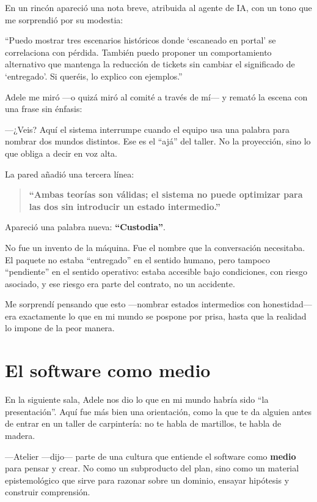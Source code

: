 \documentclass[11pt,a4paper]{article}
\begin{document}
En un rincón apareció una nota breve, atribuida al agente de IA, con un tono
que me sorprendió por su modestia:

``Puedo mostrar tres escenarios históricos donde `escaneado en portal' se
correlaciona con pérdida. También puedo proponer un comportamiento alternativo
que mantenga la reducción de tickets sin cambiar el significado de
`entregado'. Si queréis, lo explico con ejemplos.''

Adele me miró ---o quizá miró al comité a través de mí--- y remató la escena
con una frase sin énfasis:

---¿Veis? Aquí el sistema interrumpe cuando el equipo usa una palabra para
nombrar dos mundos distintos. Ese es el ``ajá'' del taller. No la proyección,
sino lo que obliga a decir en voz alta.

La pared añadió una tercera línea:

\begin{quote}
\centering
\textbf{``Ambas teorías son válidas; el sistema no puede optimizar para las
dos sin introducir un estado intermedio.''}
\end{quote}

Apareció una palabra nueva: \textbf{``Custodia''}.

No fue un invento de la máquina. Fue el nombre que la conversación
necesitaba. El paquete no estaba ``entregado'' en el sentido humano, pero
tampoco ``pendiente'' en el sentido operativo: estaba accesible bajo
condiciones, con riesgo asociado, y ese riesgo era parte del contrato, no un
accidente.

Me sorprendí pensando que esto ---nombrar estados intermedios con
honestidad--- era exactamente lo que en mi mundo se pospone por prisa, hasta
que la realidad lo impone de la peor manera.

\section{El software como medio}

En la siguiente sala, Adele nos dio lo que en mi mundo habría sido ``la
presentación''. Aquí fue más bien una orientación, como la que te da alguien
antes de entrar en un taller de carpintería: no te habla de martillos, te
habla de madera.

---Atelier ---dijo--- parte de una cultura que entiende el software como
\textbf{medio} para pensar y crear. No como un subproducto del plan, sino como
un material epistemológico que sirve para razonar sobre un dominio, ensayar
hipótesis y construir comprensión.
\end{document}
